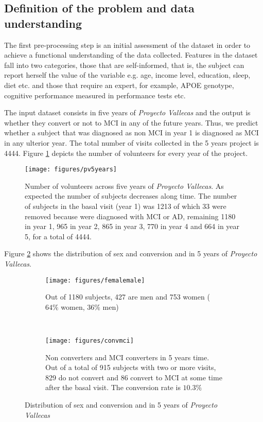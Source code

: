\documentclass[11pt]{article}
\begin{document}

\subsection{Definition of the problem and data understanding}
\label{sse:biz}
The first pre-processing step is an initial assessment of the dataset in order to achieve a functional understanding of the data collected. Features in the dataset fall into two categories, those that are self-informed, that is, the subject can report herself the value of the variable e.g. age, income level, education, sleep, diet etc. and those that require an expert, for example, APOE genotype, cognitive performance measured in performance tests etc.

The input dataset consists in five years of \emph{Proyecto Vallecas} and the output is whether they convert or not to MCI in any of the future years. Thus, we predict whether a subject that was diagnosed as non MCI in year 1 is diagnosed as MCI in any ulterior year. The total number of visits collected in the 5 years project is 4444. Figure \ref{fig:pv5years} depicts the number of volunteers for every year of the project.

\begin{figure}[h!]
        \centering
        \texttt{[image: figures/pv5years]}
        \caption{Number of volunteers across five years of \emph{Proyecto Vallecas}. As expected the number of subjects decreases along time. The number of subjects in the basal visit (year 1) was 1213 of which 33 were removed  because were diagnosed with MCI or AD, remaining 1180 in year 1, 965 in year 2, 865 in year 3, 770 in year 4 and  664 in year 5, for a total of 4444.}
\label{fig:pv5years}
\end{figure}

Figure \ref{fig:sexmci} shows the distribution of sex and conversion and in 5 years of \emph{Proyecto Vallecas}.
\begin{figure}[H]
    \centering
    \begin{subfigure}[t]{0.49\textwidth}
        \centering
        \texttt{[image: figures/femalemale]}
        \caption{Out of 1180 subjects, 427 are men and 753 women ($64\%$ women, $36\%$ men)}
    \end{subfigure}
    ~ 
    \begin{subfigure}[t]{0.49\textwidth}
        \centering
        \texttt{[image: figures/convmci]}
        \caption{Non converters and MCI converters in 5 years time. Out of a total of 915 subjects with two or more visits, 829 do not convert and 86 convert to MCI at some time after the basal visit. The conversion rate is $10.3\%$}
    \end{subfigure}%
    \label{fig:sexmci}
    \caption{Distribution of sex and conversion and in 5 years of \emph{Proyecto Vallecas}}
\end{figure}
\end{document}
